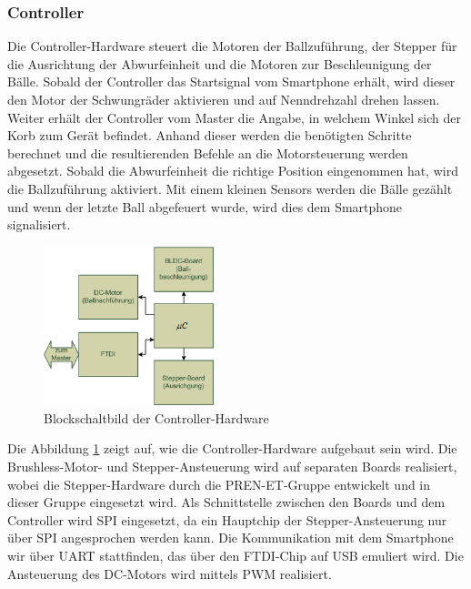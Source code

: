 \subsubsection{Controller}
\label{sec:Controller}
	Die Controller-Hardware steuert die Motoren der Ballzuführung, der Stepper für die Ausrichtung 
	der Abwurfeinheit und die Motoren zur Beschleunigung der Bälle. Sobald der Controller das Startsignal vom Smartphone erhält, 
	wird dieser den Motor der Schwungräder aktivieren und auf Nenndrehzahl drehen lassen. Weiter erhält der Controller vom Master die Angabe, 
	in welchem Winkel sich der Korb zum Gerät befindet. Anhand dieser werden die benötigten Schritte berechnet und die resultierenden Befehle 
	an die Motorsteuerung werden abgesetzt. Sobald die Abwurfeinheit die richtige Position eingenommen hat, wird die Ballzuführung aktiviert. 
	Mit einem kleinen Sensors werden die Bälle gezählt und wenn der letzte Ball abgefeuert wurde, wird dies dem Smartphone signalisiert.\\
	\begin{figure}
		\centering
		\includegraphics[width=0.44\textwidth]{Enddokumentation/Loesungskonzept/Bilder/Blockschaltbild_Controller.png}
		\caption{Blockschaltbild der Controller-Hardware}
		\label{fig:Blockschaltbild_Controller}
	\end{figure}
	Die Abbildung \ref{fig:Blockschaltbild_Controller} zeigt auf, wie die Controller-Hardware aufgebaut sein wird. 
	Die Brushless-Motor- und Stepper-Ansteuerung wird auf separaten Boards realisiert, wobei die Stepper-Hardware durch die PREN-ET-Gruppe
	entwickelt und in dieser Gruppe eingesetzt wird. Als Schnittstelle zwischen den Boards und dem Controller wird SPI eingesetzt, 
	da ein Hauptchip der Stepper-Ansteuerung nur über SPI angesprochen werden kann. Die Kommunikation mit dem Smartphone wir über UART stattfinden, 
	das über den FTDI-Chip auf USB emuliert wird. Die Ansteuerung des DC-Motors wird mittels PWM realisiert.